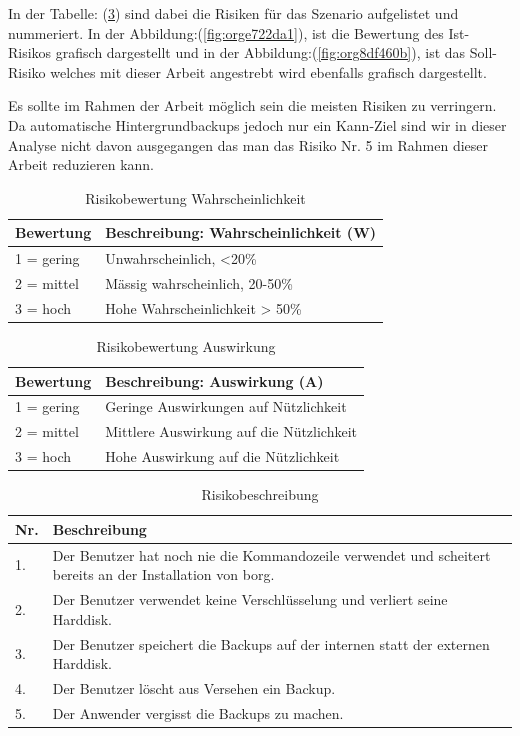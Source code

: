 In der Tabelle: (\ref{tab:org2ee8009}) sind dabei die Risiken für das
Szenario aufgelistet und nummeriert. In der Abbildung:(\ref{fig:orge722da1}), ist die
Bewertung des Ist-Risikos grafisch dargestellt und in der
Abbildung:(\ref{fig:org8df460b}), ist das Soll-Risiko welches mit dieser Arbeit
angestrebt wird ebenfalls grafisch dargestellt.

Es sollte im Rahmen der Arbeit möglich sein die meisten Risiken zu verringern.
Da automatische Hintergrundbackups jedoch nur ein Kann-Ziel sind wir in dieser
Analyse nicht davon ausgegangen das man das Risiko Nr. 5 im Rahmen dieser
Arbeit reduzieren kann.

\begin{table}[H]
\centering
\begin{tabular}{l|l}
\textbf{Bewertung} & \textbf{Beschreibung: Wahrscheinlichkeit (W)}\\
\hline
1 = gering & Unwahrscheinlich, <20\%\\
2 = mittel & Mässig wahrscheinlich, 20-50\%\\
3 = hoch & Hohe Wahrscheinlichkeit > 50\%\\
\end{tabular}
\caption{\label{tab:org1415985}
Risikobewertung Wahrscheinlichkeit}

\end{table}

\begin{table}[H]
\centering
\begin{tabular}{l|l}
\textbf{Bewertung} & \textbf{Beschreibung: Auswirkung (A)}\\
\hline
1 = gering & Geringe Auswirkungen auf Nützlichkeit\\
2 = mittel & Mittlere Auswirkung auf die Nützlichkeit\\
3 = hoch & Hohe Auswirkung auf die Nützlichkeit\\
\end{tabular}
\caption{\label{tab:org6aad5da}
Risikobewertung Auswirkung}

\end{table}

\begin{table}[H]
\centering
\begin{tabular}{|>{\columncolor[HTML]{EFEFEF}}p{}|p{}|}
\hline
\textbf{Nr.}\cellcolor[HTML]{C0C0C0} & \textbf{Beschreibung}\cellcolor[HTML]{C0C0C0}\\
\hline
1. & Der Benutzer hat noch nie die Kommandozeile verwendet und scheitert bereits an der Installation von \gls{borg}.\\
\hline
2. & Der Benutzer verwendet keine Verschlüsselung und verliert seine Harddisk.\\
\hline
3. & Der Benutzer speichert die Backups auf der internen statt der externen Harddisk.\\
\hline
4. & Der Benutzer löscht aus Versehen ein Backup.\\
\hline
5. & Der Anwender vergisst die Backups zu machen.\\
\hline
\end{tabular}
\caption{\label{tab:org2ee8009}
Risikobeschreibung}

\end{table}


